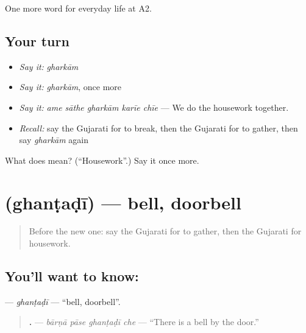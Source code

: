 \begin{grammarlens}[title={What you've built}]
One more word for everyday life at A2.
\end{grammarlens}

\subsection*{Your turn}
\begin{itemize}
\raggedright
  \item \emph{Say it:} \emph{gharkām}
  \item \emph{Say it:} \emph{gharkām}, once more
  \item \emph{Say it:} \emph{ame sāthe gharkām karīe chīe} — We do the housework together.
  \item \emph{Recall:} say the Gujarati for to break, then the Gujarati for to gather, then say \emph{gharkām} again
\end{itemize}

\begin{tcolorbox}[breakable,colback=teal!4,colframe=teal!35!black,title={Before you move on}]
What does  mean? (\textquotedblleft{}Housework\textquotedblright{}.) Say it once more.
\end{tcolorbox}
\section[\texorpdfstring{\gu{ઘંટડી} (ghanṭaḍī)}{ઘંટડી (ghanṭaḍī)}]{ (ghanṭaḍī) — bell, doorbell}

\label{lesson:GU-C162-ghantadi}



\begin{quote}
Before the new one: say the Gujarati for to gather, then the Gujarati for housework.
\end{quote}

\subsection*{You'll want to know: }
\textbf{} — \emph{ghanṭaḍī} — \textquotedblleft{}bell, doorbell\textquotedblright{}.

\begin{quote}
\textbf{   .} — \emph{bārṇā pāse ghanṭaḍī che} — \textquotedblleft{}There is a bell by the door.\textquotedblright{}
\end{quote}

